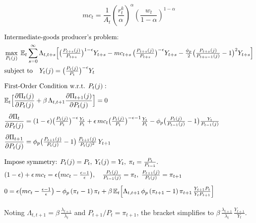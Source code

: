 \documentclass[11pt,preprint]{elsarticle}
\numberwithin{equation}{section}
\numberwithin{figure}{section}
\numberwithin{table}{section}
\begin{document}
\begin{equation}\label{marginal_cost_appendix}
\boxed{mc_t = \dfrac{1}{A_t} \left( \dfrac{r_t^k}{\alpha} \right)^{\alpha} \left( \dfrac{w_t}{1-\alpha} \right)^{1-\alpha}}
\end{equation}

\begin{align*}
& \text{Intermediate‐goods producer’s problem:} \\
& \max_{P_t(j)} \;\mathbb{E}_t \sum_{s=0}^{\infty} \Lambda_{t,t+s}
  \Bigl[
    \bigl(\tfrac{P_{t+s}(j)}{P_{t+s}}\bigr)^{1-\epsilon} Y_{t+s}
    - mc_{t+s}\,\bigl(\tfrac{P_{t+s}(j)}{P_{t+s}}\bigr)^{-\epsilon} Y_{t+s}
    - \tfrac{\phi_p}{2}\bigl(\tfrac{P_{t+s}(j)}{P_{t+s-1}(j)} - 1\bigr)^2 Y_{t+s}
  \Bigr] \\
& \text{subject to} \quad Y_t(j) = \bigl(\tfrac{P_t(j)}{P_t}\bigr)^{-\epsilon} Y_t
\\[1.5ex]
& \text{First‐Order Condition w.r.t. }P_t(j): \\
& \mathbb{E}_t\Bigl[
    \frac{\partial \Pi_t(j)}{\partial P_t(j)}
    + \beta\,\Lambda_{t,t+1}
      \frac{\partial \Pi_{t+1}(j)}{\partial P_t(j)}
  \Bigr] = 0
\\[1ex]
& \frac{\partial \Pi_t}{\partial P_t(j)}
  = (1-\epsilon)\bigl(\tfrac{P_t(j)}{P_t}\bigr)^{-\epsilon}\tfrac{Y_t}{P_t}
    + \epsilon\,mc_t\bigl(\tfrac{P_t(j)}{P_t}\bigr)^{-\epsilon-1}\tfrac{Y_t}{P_t}
    - \phi_p\bigl(\tfrac{P_t(j)}{P_{t-1}(j)}-1\bigr)\tfrac{Y_t}{P_{t-1}(j)}
\\[1ex]
& \frac{\partial \Pi_{t+1}}{\partial P_t(j)}
  = \phi_p\bigl(\tfrac{P_{t+1}(j)}{P_t(j)}-1\bigr)\,\tfrac{P_{t+1}(j)}{P_t(j)^2}\,Y_{t+1}
\\[2ex]
& \text{Impose symmetry: }P_t(j)=P_t,\;Y_t(j)=Y_t,\;\pi_t=\tfrac{P_t}{P_{t-1}}.\\
& (1-\epsilon)+\epsilon\,mc_t = \epsilon\bigl(mc_t-\tfrac{\epsilon-1}{\epsilon}\bigr),\quad
  \tfrac{P_t(j)}{P_{t-1}(j)}=\pi_t,\;\tfrac{P_{t+1}(j)}{P_t(j)}=\pi_{t+1}
\\[1ex]
& 0 = \epsilon\bigl(mc_t-\tfrac{\epsilon-1}{\epsilon}\bigr)
      - \phi_p\,(\pi_t-1)\,\pi_t
      + \beta\,\mathbb{E}_t\Bigl[
          \Lambda_{t,t+1}\,\phi_p\,(\pi_{t+1}-1)\,\pi_{t+1}
          \,\tfrac{Y_{t+1}P_t}{Y_tP_{t+1}}
        \Bigr]
\\[1ex]
\end{align*}

Noting \(\Lambda_{t,t+1}=\beta\,\tfrac{\lambda_{t+1}}{\lambda_t}\) and
\(P_{t+1}/P_t=\pi_{t+1}\), the bracket simplifies to
\(\beta\,\tfrac{\lambda_{t+1}}{\lambda_t}\,\tfrac{Y_{t+1}}{Y_t}\).
\end{document}
